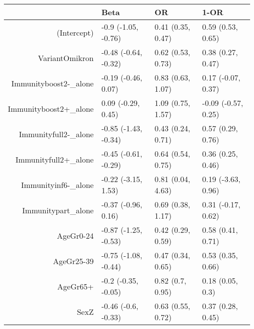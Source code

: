 \begin{table}[ht]
\centering
\begin{tabular}{rlll}
  \hline
 & Beta & OR & 1-OR \\ 
  \hline
(Intercept) & -0.9 (-1.05, -0.76) & 0.41 (0.35, 0.47) & 0.59 (0.53, 0.65) \\ 
  VariantOmikron & -0.48 (-0.64, -0.32) & 0.62 (0.53, 0.73) & 0.38 (0.27, 0.47) \\ 
  Immunityboost2-\_alone & -0.19 (-0.46, 0.07) & 0.83 (0.63, 1.07) & 0.17 (-0.07, 0.37) \\ 
  Immunityboost2+\_alone & 0.09 (-0.29, 0.45) & 1.09 (0.75, 1.57) & -0.09 (-0.57, 0.25) \\ 
  Immunityfull2-\_alone & -0.85 (-1.43, -0.34) & 0.43 (0.24, 0.71) & 0.57 (0.29, 0.76) \\ 
  Immunityfull2+\_alone & -0.45 (-0.61, -0.29) & 0.64 (0.54, 0.75) & 0.36 (0.25, 0.46) \\ 
  Immunityinf6-\_alone & -0.22 (-3.15, 1.53) & 0.81 (0.04, 4.63) & 0.19 (-3.63, 0.96) \\ 
  Immunitypart\_alone & -0.37 (-0.96, 0.16) & 0.69 (0.38, 1.17) & 0.31 (-0.17, 0.62) \\ 
  AgeGr0-24 & -0.87 (-1.25, -0.53) & 0.42 (0.29, 0.59) & 0.58 (0.41, 0.71) \\ 
  AgeGr25-39 & -0.75 (-1.08, -0.44) & 0.47 (0.34, 0.65) & 0.53 (0.35, 0.66) \\ 
  AgeGr65+ & -0.2 (-0.35, -0.05) & 0.82 (0.7, 0.95) & 0.18 (0.05, 0.3) \\ 
  SexZ & -0.46 (-0.6, -0.33) & 0.63 (0.55, 0.72) & 0.37 (0.28, 0.45) \\ 
   \hline
\end{tabular}
\end{table}
